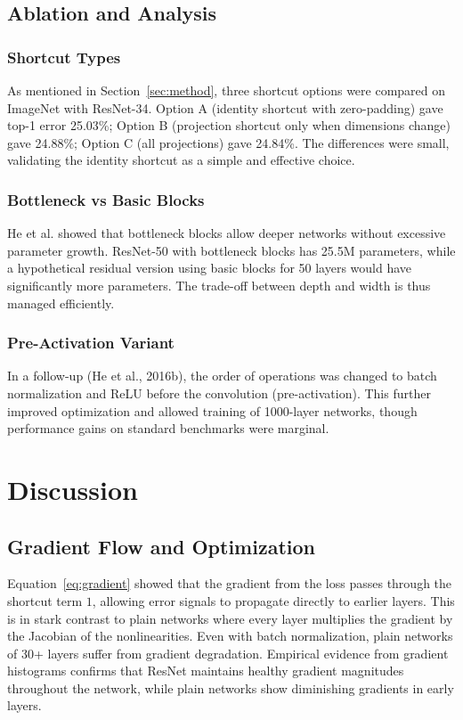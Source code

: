 \documentclass[11pt,a4paper]{article}
\begin{document}
\subsection{Ablation and Analysis}
\subsubsection{Shortcut Types}
As mentioned in Section~\ref{sec:method}, three shortcut options were compared on ImageNet with ResNet-34. Option A (identity shortcut with zero-padding) gave top-1 error 25.03\%; Option B (projection shortcut only when dimensions change) gave 24.88\%; Option C (all projections) gave 24.84\%. The differences were small, validating the identity shortcut as a simple and effective choice.

\subsubsection{Bottleneck vs Basic Blocks}
He et al. showed that bottleneck blocks allow deeper networks without excessive parameter growth. ResNet-50 with bottleneck blocks has 25.5M parameters, while a hypothetical residual version using basic blocks for 50 layers would have significantly more parameters. The trade-off between depth and width is thus managed efficiently.

\subsubsection{Pre-Activation Variant}
In a follow-up (He et al., 2016b), the order of operations was changed to batch normalization and ReLU before the convolution (pre-activation). This further improved optimization and allowed training of 1000-layer networks, though performance gains on standard benchmarks were marginal.

\section{Discussion}
\label{sec:discussion}

\subsection{Gradient Flow and Optimization}
Equation~\ref{eq:gradient} showed that the gradient from the loss passes through the shortcut term $1$, allowing error signals to propagate directly to earlier layers. This is in stark contrast to plain networks where every layer multiplies the gradient by the Jacobian of the nonlinearities. Even with batch normalization, plain networks of 30+ layers suffer from gradient degradation. Empirical evidence from gradient histograms confirms that ResNet maintains healthy gradient magnitudes throughout the network, while plain networks show diminishing gradients in early layers.
\end{document}
